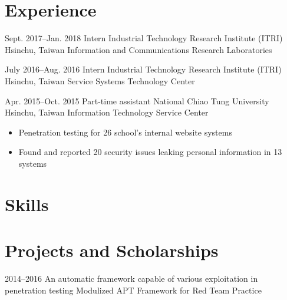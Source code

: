 \documentclass[11pt,a4paper,sans,english]{moderncv}
\begin{document}
\vspace{-5pt}
\section{Experience}
    \cventry
        {Sept. 2017--Jan. 2018} %
        {Intern} %
        {Industrial Technology Research Institute (ITRI)} %
        {Hsinchu, Taiwan} %
        {Information and Communications Research Laboratories} %
        {} %

    \cventry
        {July 2016--Aug. 2016}
        {Intern}
        {Industrial Technology Research Institute (ITRI)}
        {Hsinchu, Taiwan}
        {Service Systems Technology Center}
        {}
        
    \cventry
        {Apr. 2015--Oct. 2015}
        {Part-time assistant}
        {National Chiao Tung University}
        {Hsinchu, Taiwan}
        {Information Technology Service Center}
        {\begin{itemize}
        \item Penetration testing for 26 school's internal website systems
        \item Found and reported 20 security issues leaking personal information in 13 systems
        \end{itemize}}
        
\section{Skills}
        
\section{Projects and Scholarships}
    \cventry
        {2014--2016} %
        {An automatic framework capable of various exploitation in penetration testing} %
        {Modulized APT Framework for Red Team Practice} %
        {}
        {} %
        {%
        }
        
\end{document}
